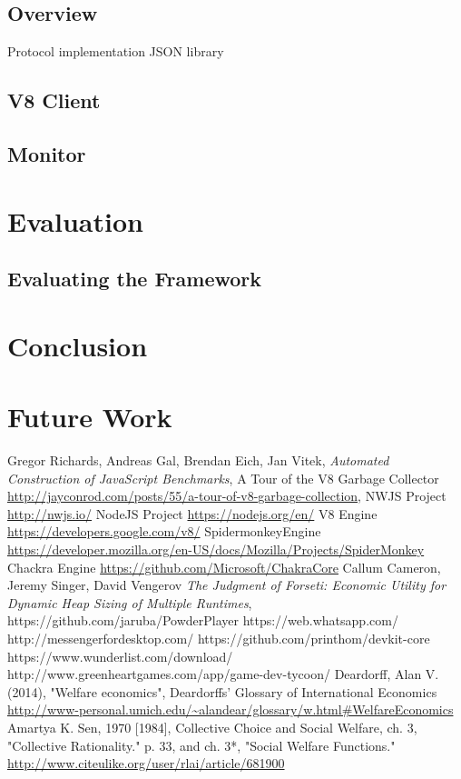 \documentclass{l4proj}
\begin{document}
\subsection{Overview}
Protocol implementation
JSON library
\subsection{V8 Client}
\subsection{Monitor}
\section{Evaluation}
\subsection{Evaluating the Framework}
\section{Conclusion}
\section{Future Work}

\begin{thebibliography}{9}
  Gregor Richards, Andreas Gal, Brendan Eich, Jan Vitek,
  \emph{Automated Construction of JavaScript Benchmarks},
A Tour of the V8 Garbage Collector
\url{http://jayconrod.com/posts/55/a-tour-of-v8-garbage-collection},
  NWJS Project
  \url{http://nwjs.io/}
  NodeJS Project
  \url{https://nodejs.org/en/}
  V8 Engine
  \url{https://developers.google.com/v8/}
SpidermonkeyEngine
\url{https://developer.mozilla.org/en-US/docs/Mozilla/Projects/SpiderMonkey}
Chackra Engine
\url{https://github.com/Microsoft/ChakraCore}
  Callum Cameron, Jeremy Singer, David Vengerov
  \emph{The Judgment of Forseti: Economic Utility for Dynamic Heap Sizing of Multiple Runtimes},
  https://github.com/jaruba/PowderPlayer
https://web.whatsapp.com/
http://messengerfordesktop.com/
https://github.com/printhom/devkit-core
https://www.wunderlist.com/download/
http://www.greenheartgames.com/app/game-dev-tycoon/
Deardorff, Alan V. (2014), "Welfare economics", Deardorffs' Glossary of International Economics \url{http://www-personal.umich.edu/~alandear/glossary/w.html#WelfareEconomics}
Amartya K. Sen, 1970 [1984], Collective Choice and Social Welfare, ch. 3, "Collective Rationality." p. 33, and ch. 3*, "Social Welfare Functions." \url{http://www.citeulike.org/user/rlai/article/681900}
\end{thebibliography}
\end{document}
